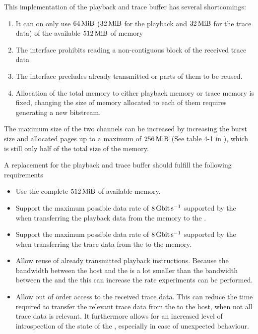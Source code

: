 This implementation of the playback and trace buffer has several shortcomings:
\begin{enumerate}
  \item It can on only use \(\SI{64}{\mebi\byte}\) (\(\SI{32}{\mebi\byte}\) for the playback and \(\SI{32}{\mebi\byte}\) for the trace data) of the available $\SI{512}{\mebi\byte}$ of memory\label{point:limited_size}
  \item The \FIFO{} interface prohibits reading a non-contiguous block of the received trace data
  \item The \FIFO{} interface precludes already transmitted \PlaybackProgram{} or parts of them to be reused.
  \item Allocation of the total memory to either playback memory or trace memory is fixed, changing the size of memory allocated to each of them requires generating a new \FPGA{} bitstream.
\end{enumerate}
The maximum size of the two \VFIFO{} channels can be increased by increasing the burst size and allocated pages up to a maximum of \(\SI{256}{\mebi\byte}\) (See table 4-1 in \autocite{ref:vfifo}), which is still only half of the total size of the memory.

A replacement for the playback and trace buffer should fulfill the following requirements
\begin{itemize}
  \item Use the complete $\SI{512}{\mebi\byte}$ of available memory.
  \item Support the maximum possible data rate of $\pbExecBandwidth{}$ supported by the \pbexec{} when transferring the playback data from the memory to the \pbexec{}.
  \item Support the maximum possible data rate of $\pbExecBandwidth{}$ supported by the \pbexec{} when transferring the trace data from the \pbexec{} to the memory.
  \item Allow reuse of already transmitted playback instructions. Because the bandwidth between the host and the \FPGA{} is a lot smaller than the bandwidth between the \FPGA{} and the \ASIC{} this can increase the rate experiments can be performed.
  \item Allow out of order access to the received trace data. This can reduce the time required to transfer the relevant trace data from the \FPGA{} to the host, when not all trace data is relevant.  It furthermore allows for an increased level of introspection of the state of the \FPGA{}, especially in case of unexpected behaviour.
\end{itemize}
